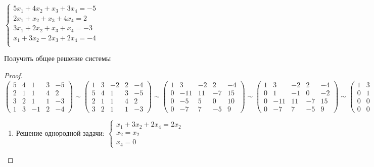 \documentclass{book}
\theoremstyle{definition}
\begin{document}
\begin{problem}
    $\begin{cases}
    5x_1+4x_2+x_3+3x_4=-5\\
    2x_1+x_2+x_3+4x_4=2\\
    3x_1+2x_2+x_3+x_4=-3\\
    x_1+3x_2-2x_3+2x_4=-4\\
    \end{cases}$

    Получить общее решение системы
\end{problem}
\begin{proof}
    $\begin{pmatrix} 5&4&1&3&-5\\2&1&1&4&2\\3&2&1&1&-3\\1&3&-1&2&-4 \end{pmatrix} \sim \begin{pmatrix} 1&3&-2&2&-4\\5&4&1&3&-5\\2&1&1&4&2\\3&2&1&1&-3 \end{pmatrix} \sim \begin{pmatrix} 1&3&-2&2&-4\\0&-11&11&-7&15\\0&-5&5&0&10\\0&-7&7&-5&9 \end{pmatrix} \sim \begin{pmatrix} 1&3&-2&2&-4\\0&1&-1&0&-2\\0&-11&11&-7&15\\0&-7&7&-5&9 \end{pmatrix} \sim \begin{pmatrix} 1&3&-2&2&-4\\0&1&-2&0&-2\\0&0&0&0&-7\\0&0&0&-5&-5 \end{pmatrix} \sim \begin{pmatrix} 1&3&-2&2&-4\\0&1&-1&0&-2\\0&0&0&1&1\\0&0&0&0&0 \end{pmatrix} $

    \begin{enumerate}
        \item Решение однородной задачи:
           $\begin{cases}
               x_1+3x_2+2x_4=2x_2\\
               x_2=x_2\\
               x_4=0
           \end{cases}$


\end{enumerate}
\end{proof}
\end{document}
